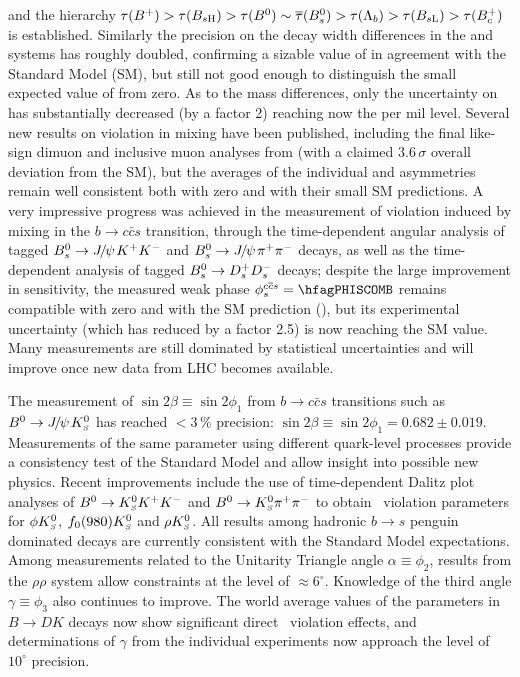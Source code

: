 and the hierarchy
$\tau(\Bu)> \tau(B_{s\rm H})> \tau(\Bd) \sim \bar{\tau}(\Bs) > \tau(\Lambda_b) > \tau(B_{s\rm L}) > \tau(\Bc)$
is established. Similarly the precision on the decay width differences in the 
\Bd and \Bs systems has roughly doubled, confirming a sizable value of \DGs in agreement with the 
Standard Model (SM), but still not good enough to distinguish the small expected value of \DGd from zero.
As to the mass differences, only the uncertainty on \dms has substantially decreased (by a factor 2) 
reaching now the per mil level. Several new results on \CP violation in mixing have been 
published, including the final like-sign dimuon and inclusive muon analyses from \dzero (with a claimed 
$3.6\,\sigma$ overall deviation from the SM), but the averages of the individual \Bd and \Bs asymmetries 
remain well consistent both with zero and with their small SM predictions. 
A very impressive progress was achieved in the measurement of
\CP violation induced by \Bs mixing in the $b\to c\bar{c}s$ transition, through the 
time-dependent angular analysis of tagged $B^0_s\to {J\mskip -3mu/\mskip -2mu\psi\mskip 2mu} K^+K^-$ and $B^0_s\to {J\mskip -3mu/\mskip -2mu\psi\mskip 2mu} \pi^+\pi^-$ decays,
as well as the time-dependent analysis of tagged  $B^0_s\to D_s^+ D_s^-$ decays; 
despite the large improvement in sensitivity, the measured weak phase
$\phiccbars = \hfagPHISCOMB$ remains compatible with zero and with the SM prediction (\hfagPHISSM), 
but its experimental uncertainty (which has reduced by a factor 2.5) is now reaching the SM value.
Many measurements are still dominated by 
statistical uncertainties and will improve once new data from LHC becomes available.

The measurement of $\sin 2\beta \equiv \sin 2\phi_1$ from $b \to
c\bar{c}s$ transitions such as $B^0 \to {J\mskip -3mu/\mskip -2mu\psi\mskip 2mu}K^0_{\scriptscriptstyle S}$ has reached $<3\,\%$
precision: $\sin 2\beta \equiv \sin 2\phi_1 = 0.682 \pm 0.019$.
Measurements of the same parameter using different quark-level processes
provide a consistency test of the Standard Model and allow insight into
possible new physics.  Recent improvements include the use of
time-dependent Dalitz plot analyses of $B^0 \to K^0_{\scriptscriptstyle S}K^+K^-$ and $B^0 \to
K^0_{\scriptscriptstyle S}\pi^+\pi^-$ to obtain \CP\ violation parameters for $\phi K^0_{\scriptscriptstyle S}$,
$f_0(980)K^0_{\scriptscriptstyle S}$ and $\rho K^0_{\scriptscriptstyle S}$.  All results among hadronic $b \to s$
penguin dominated decays are currently consistent with the Standard
Model expectations.  Among measurements related to the Unitarity
Triangle angle $\alpha \equiv \phi_2$, results from the
$\rho\rho$ system allow constraints at the level of $\approx
6^\circ$.  Knowledge of the third angle $\gamma \equiv \phi_3$ also
continues to improve.  The world average values of
the parameters in $B \to DK$ decays now show significant direct 
\CP\ violation effects, and determinations of $\gamma$ from the individual experiments now approach the level of $10^\circ$ precision.

